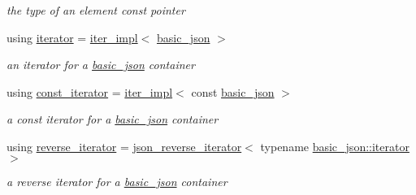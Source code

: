 \begin{DoxyCompactItemize}
\begin{DoxyCompactList}\small\item\em the type of an element const pointer \end{DoxyCompactList}\item 
\mbox{\label{classnlohmann_1_1basic__json_a099316232c76c034030a38faa6e34dca}} 
using \mbox{\hyperlink{classnlohmann_1_1basic__json_a099316232c76c034030a38faa6e34dca}{iterator}} = \mbox{\hyperlink{classnlohmann_1_1detail_1_1iter__impl}{iter\+\_\+impl}}$<$ \mbox{\hyperlink{classnlohmann_1_1basic__json}{basic\+\_\+json}} $>$
\begin{DoxyCompactList}\small\item\em an iterator for a \mbox{\hyperlink{classnlohmann_1_1basic__json}{basic\+\_\+json}} container \end{DoxyCompactList}\item 
\mbox{\label{classnlohmann_1_1basic__json_a41a70cf9993951836d129bb1c2b3126a}} 
using \mbox{\hyperlink{classnlohmann_1_1basic__json_a41a70cf9993951836d129bb1c2b3126a}{const\+\_\+iterator}} = \mbox{\hyperlink{classnlohmann_1_1detail_1_1iter__impl}{iter\+\_\+impl}}$<$ const \mbox{\hyperlink{classnlohmann_1_1basic__json}{basic\+\_\+json}} $>$
\begin{DoxyCompactList}\small\item\em a const iterator for a \mbox{\hyperlink{classnlohmann_1_1basic__json}{basic\+\_\+json}} container \end{DoxyCompactList}\item 
\mbox{\label{classnlohmann_1_1basic__json_ac223d5560c2b05a208c88de67376c5f2}} 
using \mbox{\hyperlink{classnlohmann_1_1basic__json_ac223d5560c2b05a208c88de67376c5f2}{reverse\+\_\+iterator}} = \mbox{\hyperlink{classnlohmann_1_1detail_1_1json__reverse__iterator}{json\+\_\+reverse\+\_\+iterator}}$<$ typename \mbox{\hyperlink{classnlohmann_1_1basic__json_a099316232c76c034030a38faa6e34dca}{basic\+\_\+json\+::iterator}} $>$
\begin{DoxyCompactList}\small\item\em a reverse iterator for a \mbox{\hyperlink{classnlohmann_1_1basic__json}{basic\+\_\+json}} container \end{DoxyCompactList}\item 
\mbox{\label{classnlohmann_1_1basic__json_a72be3c24bfa24f0993d6c11af03e7404}} 

\end{DoxyCompactItemize}
